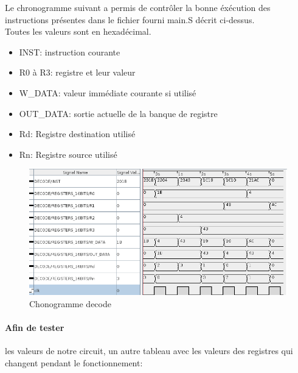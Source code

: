 \documentclass[a4paper]{article} %
\begin{document}
\pagebreak
Le chronogramme suivant a permis de contrôler la bonne éxécution des instructions présentes dans le fichier fourni main.S décrit ci-dessus.\\
Toutes les valeurs sont en hexadécimal.
\begin{itemize}
    \item     INST: instruction courante
    \item     R0 à R3: registre et leur valeur
    \item    W\_DATA: valeur immédiate courante si utilisé
    \item    OUT\_DATA: sortie actuelle de la banque de registre
    \item    Rd: Registre destination utilisé
    \item    Rn: Registre source utilisé
\end{itemize}

\begin{figure}[h]
    \centering
    \includegraphics[width=1.3\textwidth]{src/CHRONO_MAIN.png}
    \caption{Chonogramme decode}
    \label{chrono_decode}
\end{figure}
\pagebreak

\paragraph{Afin de tester} les valeurs de notre circuit, un autre tableau avec les valeurs des registres qui changent pendant le fonctionnement:\\
\end{document}
